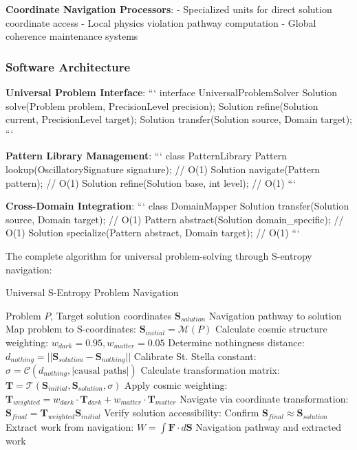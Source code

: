 \documentclass[11pt,a4paper]{article}
\theoremstyle{remark}
\begin{document}
\textbf{Coordinate Navigation Processors}:
- Specialized units for direct solution coordinate access
- Local physics violation pathway computation
- Global coherence maintenance systems

\subsubsection{Software Architecture}

\textbf{Universal Problem Interface}:
```
interface UniversalProblemSolver {
    Solution solve(Problem problem, PrecisionLevel precision);
    Solution refine(Solution current, PrecisionLevel target);
    Solution transfer(Solution source, Domain target);
}
```

\textbf{Pattern Library Management}:
```
class PatternLibrary {
    Pattern lookup(OscillatorySignature signature);  // O(1)
    Solution navigate(Pattern pattern);               // O(1)
    Solution refine(Solution base, int level);        // O(1)
}
```

\textbf{Cross-Domain Integration}:
```
class DomainMapper {
    Solution transfer(Solution source, Domain target);  // O(1)
    Pattern abstract(Solution domain_specific);         // O(1)
    Solution specialize(Pattern abstract, Domain target); // O(1)
}
```

The complete algorithm for universal problem-solving through S-entropy navigation:

\begin{algorithm}[H]
\caption{Universal S-Entropy Problem Navigation}
\begin{algorithmic}[1]
\REQUIRE Problem $P$, Target solution coordinates $\mathbf{S}_{solution}$
\ENSURE Navigation pathway to solution
\STATE Map problem to S-coordinates: $\mathbf{S}_{initial} = \mathcal{M}(P)$
\STATE Calculate cosmic structure weighting: $w_{dark} = 0.95, w_{matter} = 0.05$
\STATE Determine nothingness distance: $d_{nothing} = ||\mathbf{S}_{solution} - \mathbf{S}_{nothing}||$
\STATE Calibrate St. Stella constant: $\sigma = \mathcal{C}(d_{nothing}, |\text{causal paths}|)$
\STATE Calculate transformation matrix: $\mathbf{T} = \mathcal{T}(\mathbf{S}_{initial}, \mathbf{S}_{solution}, \sigma)$
\STATE Apply cosmic weighting: $\mathbf{T}_{weighted} = w_{dark} \cdot \mathbf{T}_{dark} + w_{matter} \cdot \mathbf{T}_{matter}$
\STATE Navigate via coordinate transformation: $\mathbf{S}_{final} = \mathbf{T}_{weighted} \mathbf{S}_{initial}$
\STATE Verify solution accessibility: Confirm $\mathbf{S}_{final} \approx \mathbf{S}_{solution}$
\STATE Extract work from navigation: $W = \int \mathbf{F} \cdot d\mathbf{S}$
\RETURN Navigation pathway and extracted work
\end{algorithmic}
\end{algorithm}
\end{document}

